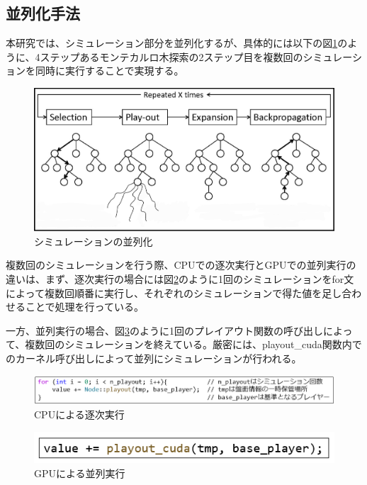 \documentclass[10pt, a4paper]{jsarticle}
\begin{document}
\subsection{並列化手法}
本研究では、シミュレーション部分を並列化するが、具体的には以下の図\ref{fig:parallel}のように、4ステップあるモンテカルロ木探索の2ステップ目を複数回のシミュレーションを同時に実行することで実現する。
\begin{figure}[ht]
    \begin{center}
        \includegraphics[width=15cm]{img/mcts_parallel.jpg}
        \caption{シミュレーションの並列化} \label{fig:parallel}
    \end{center}
\end{figure}
\par 複数回のシミュレーションを行う際、CPUでの逐次実行とGPUでの並列実行の違いは、まず、逐次実行の場合には図\ref{fig:cpu_mcts_code}のように1回のシミュレーションをfor文によって複数回順番に実行し、それぞれのシミュレーションで得た値を足し合わせることで処理を行っている。
\par 一方、並列実行の場合、図\ref{fig:gpu_mcts_code}のように1回のプレイアウト関数の呼び出しによって、複数回のシミュレーションを終えている。厳密には、playout\_cuda関数内でのカーネル呼び出しによって並列にシミュレーションが行われる。
\begin{figure}[ht]
    \begin{center}
        \includegraphics[width=15cm]{img/cpu_mcts_code.png}
        \caption{CPUによる逐次実行}
        \label{fig:cpu_mcts_code}
    \end{center}
\end{figure}
\begin{figure}[ht]
    \begin{center}
        \includegraphics[width=12cm]{img/gpu_mcts_code.png}
        \caption{GPUによる並列実行}
        \label{fig:gpu_mcts_code}
    \end{center}
\end{figure}
\end{document}
